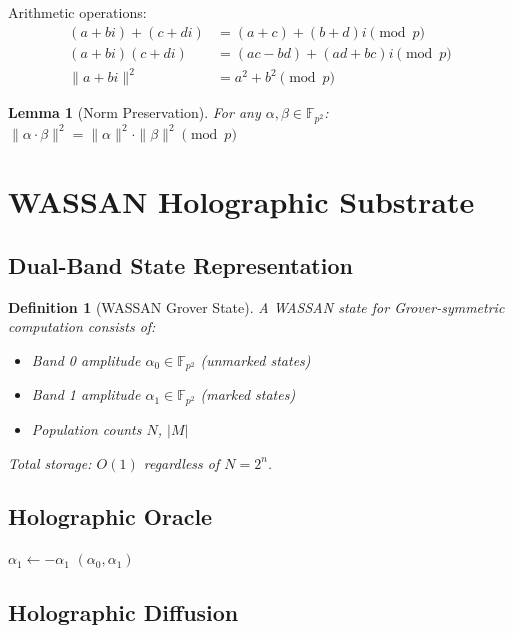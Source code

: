 \documentclass[11pt,a4paper]{article}
\newtheorem{lemma}[theorem]{Lemma}
\newtheorem{definition}{Definition}
\begin{document}
Arithmetic operations:
\begin{align}
(a + bi) + (c + di) &= (a+c) + (b+d)i \pmod{p} \\
(a + bi)(c + di) &= (ac - bd) + (ad + bc)i \pmod{p} \\
\|a + bi\|^2 &= a^2 + b^2 \pmod{p}
\end{align}

\begin{lemma}[Norm Preservation]
For any $\alpha, \beta \in \mathbb{F}_{p^2}$: $\|\alpha \cdot \beta\|^2 = \|\alpha\|^2 \cdot \|\beta\|^2 \pmod{p}$
\end{lemma}

\section{WASSAN Holographic Substrate}

\subsection{Dual-Band State Representation}

\begin{definition}[WASSAN Grover State]
A WASSAN state for Grover-symmetric computation consists of:
\begin{itemize}
    \item Band 0 amplitude $\alpha_0 \in \mathbb{F}_{p^2}$ (unmarked states)
    \item Band 1 amplitude $\alpha_1 \in \mathbb{F}_{p^2}$ (marked states)
    \item Population counts $N$, $|M|$
\end{itemize}
Total storage: $O(1)$ regardless of $N = 2^n$.
\end{definition}

\subsection{Holographic Oracle}

\begin{algorithm}
\caption{WASSAN Oracle}
\begin{algorithmic}[1]
    \State $\alpha_1 \gets -\alpha_1$ 
    \State \Return $(\alpha_0, \alpha_1)$
\EndProcedure
\end{algorithmic}
\end{algorithm}

\subsection{Holographic Diffusion}
\end{document}
